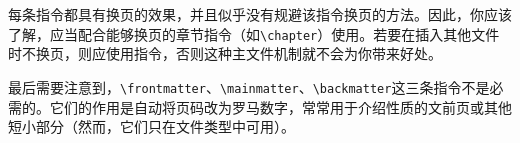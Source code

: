\begin{exclamation}
每条指令\verb||都具有换页的效果，并且似乎没有规避该指令换页的方法。因此，你应该了解，\verb||应当配合能够换页的章节指令（如\verb|\chapter|）使用。若要在插入其他文件时不换页，则应使用指令\verb||，否则这种主文件机制就不会为你带来好处。
\end{exclamation}

最后需要注意到，\verb|\frontmatter|、\verb|\mainmatter|、\verb|\backmatter|这三条指令不是必需的。它们的作用是自动将页码改为罗马数字，常常用于介绍性质的文前页或其他短小部分（然而，它们只在文件类型中可用）。